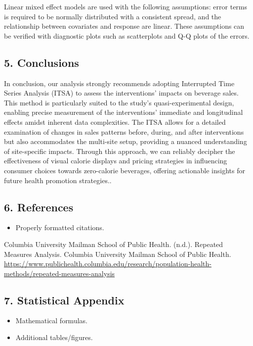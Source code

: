 \documentclass[
]{article}
\providecommand{\tightlist}{%
  \setlength{\itemsep}{0pt}\setlength{\parskip}{0pt}}
\begin{document}
Linear mixed effect models are used with the following assumptions:
error terms is required to be normally distributed with a consistent
spread, and the relationship between covariates and response are linear.
These assumptions can be verified with diagnostic plots such as
scatterplots and Q-Q plots of the errors.

\hypertarget{conclusions}{%
\subsection{5. Conclusions}\label{conclusions}}

In conclusion, our analysis strongly recommends adopting Interrupted
Time Series Analysis (ITSA) to assess the interventions' impacts on
beverage sales. This method is particularly suited to the study's
quasi-experimental design, enabling precise measurement of the
interventions' immediate and longitudinal effects amidst inherent data
complexities. The ITSA allows for a detailed examination of changes in
sales patterns before, during, and after interventions but also
accommodates the multi-site setup, providing a nuanced understanding of
site-specific impacts. Through this approach, we can reliably decipher
the effectiveness of visual calorie displays and pricing strategies in
influencing consumer choices towards zero-calorie beverages, offering
actionable insights for future health promotion strategies..

\hypertarget{references}{%
\subsection{6. References}\label{references}}

\begin{itemize}
\tightlist
\item
  Properly formatted citations.
\end{itemize}

Columbia University Mailman School of Public Health. (n.d.). Repeated
Measures Analysis. Columbia University Mailman School of Public Health.
\url{https://www.publichealth.columbia.edu/research/population-health-methods/repeated-measures-analysis}

\hypertarget{statistical-appendix}{%
\subsection{7. Statistical Appendix}\label{statistical-appendix}}

\begin{itemize}
\tightlist
\item
  Mathematical formulas.
\item
  Additional tables/figures.
\end{itemize}
\end{document}
